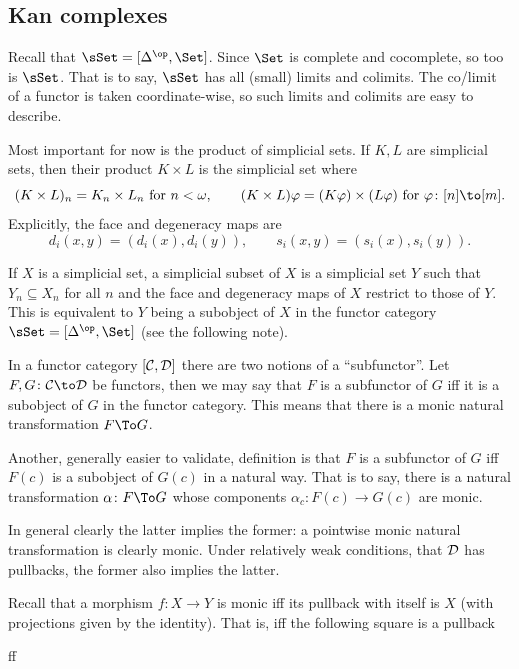 \subsection{Kan complexes}

Recall that $\sSet=[\Delta^\op,\Set]$.
Since $\Set$ is complete and cocomplete, so too is $\sSet$.
That is to say, $\sSet$ has all (small) limits and colimits.
The co/limit of a functor is taken coordinate-wise, so such limits and colimits are easy to describe.

Most important for now is the product of simplicial sets.
If $K,L$ are simplicial sets, then their product $K\times L$ is the simplicial set where
$$ (K\times L)_n = K_n\times L_n\hbox{ for $n<\omega$},\qquad (K\times L)\phi = (K\phi)\times(L\phi)\hbox{ for $\phi\colon[n]\to[m]$} . $$
Explicitly, the face and degeneracy maps are
$$ d_i(x,y) = (d_i(x),d_i(y)),\qquad s_i(x,y) = (s_i(x),s_i(y)) . $$

If $X$ is a simplicial set, a {\emphcolor simplicial subset} of $X$ is a simplicial set $Y$ such that $Y_n\subseteq X_n$ for all $n$ and the face and degeneracy maps
of $X$ restrict to those of $Y$.
This is equivalent to $Y$ being a subobject of $X$ in the functor category $\sSet=[\Delta^\op,\Set]$ (see the following note).

\bnote

    In a functor category $[{{\cal C}},{{\cal D}}]$ there are two notions of a ``subfunctor''.
    Let $F,G\colon\C\to\D$ be functors, then we may say that $F$ is a subfunctor of $G$ iff it is a subobject of $G$ in the functor category.
    This means that there is a monic natural transformation $F\To G$.

    Another, generally easier to validate, definition is that $F$ is a subfunctor of $G$ iff $F(c)$ is a subobject of $G(c)$ in a natural way.
    That is to say, there is a natural transformation $\alpha\colon F\To G$ whose components $\alpha_c\colon F(c)\to G(c)$ are monic.

    In general clearly the latter implies the former: a pointwise monic natural transformation is clearly monic.
    Under relatively weak conditions, that ${{\cal D}}$ has pullbacks, the former also implies the latter.

    Recall that a morphism $f\colon X\to Y$ is monic iff its pullback with itself is $X$ (with projections given by the identity).
    That is, iff the following square is a pullback

        {\id}{f}{\id}{f}

